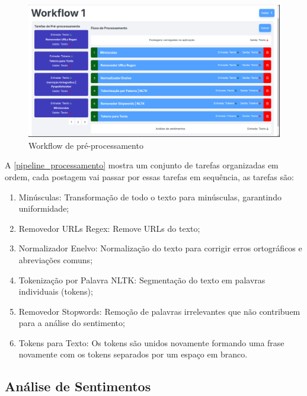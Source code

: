 \documentclass[
	12pt,				%
	oneside,			%
	a4paper,			%
	english,			%
	french,				%
	spanish,			%
	brazil				%
	]{abntex2}
\begin{document}
\begin{figure}[htbp]
\hypertarget{pipeline_processamento}{%
\caption{Workflow de pré-processamento}\label{pipeline_processamento}
\begin{center}
\includegraphics[scale=0.35]{imagens/sentilytics/estudo-caso/workflow.png}
\end{center}
}
\end{figure}

A \autoref{pipeline_processamento} mostra um conjunto de tarefas
organizadas em ordem, cada postagem vai passar por essas tarefas em
sequência, as tarefas são:

\begin{enumerate}
\def\labelenumi{\arabic{enumi})}
\tightlist
\item
  Minúsculas: Transformação de todo o texto para minúsculas, garantindo
  uniformidade;
\item
  Removedor URLs Regex: Remove URLs do texto;
\item
  Normalizador Enelvo: Normalização do texto para corrigir erros
  ortográficos e abreviações comuns;
\item
  Tokenização por Palavra \textbar{} NLTK: Segmentação do texto em
  palavras individuais (tokens);
\item
  Removedor Stopwords: Remoção de palavras irrelevantes que não
  contribuem para a análise do sentimento;
\item
  Tokens para Texto: Os tokens são unidos novamente formando uma frase
  novamente com os tokens separados por um espaço em branco.
\end{enumerate}

\hypertarget{anuxe1lise-de-sentimentos}{%
\subsection{Análise de Sentimentos}\label{anuxe1lise-de-sentimentos}}
\end{document}
